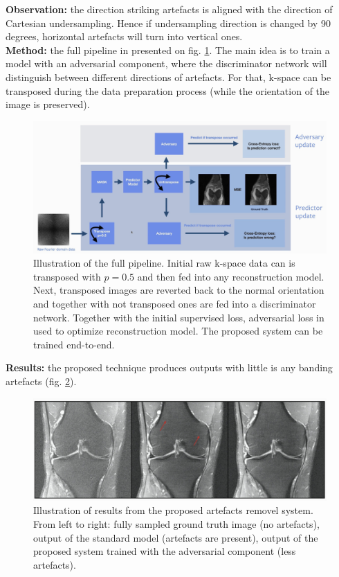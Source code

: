 {\bf Observation:} the direction striking artefacts is aligned with the direction of Cartesian undersampling. Hence if undersampling direction is changed by 90 degrees, horizontal artefacts will turn into vertical ones. \\

{\bf Method:} the full pipeline in presented on fig. \ref{fig:adversaria_art_removal_pipeline}. The main idea is to train a model with an adversarial component, where the discriminator network will distinguish between different directions of artefacts. 
For that, k-space can be transposed during the data preparation process (while the orientation of the image is preserved). \\

\begin{figure}[h!]
    \centering
    \includegraphics[scale=0.4]{neurips-2020/images/Screenshot 2020-12-15 at 09.34.10.png}
    \caption{Illustration of the full pipeline. Initial raw k-space data can is transposed with $p = 0.5$ and then fed into any reconstruction model. Next, transposed images are reverted back to the normal orientation and together with not transposed ones are fed into a discriminator network. Together with the initial supervised loss, adversarial loss in used to optimize reconstruction model. The proposed system can be trained end-to-end.}
    \label{fig:adversaria_art_removal_pipeline}
\end{figure}

{\bf Results:} the proposed technique produces outputs with little is any banding artefacts (fig. \ref{fig:result_adv_art_removal}).

\begin{figure}[h!]
    \centering
    \includegraphics[scale=0.4]{neurips-2020/images/Screenshot 2020-12-15 at 09.45.10.png}
    \caption{Illustration of results from the proposed artefacts removel system. From left to right: fully sampled ground truth image (no artefacts), output of the standard model (artefacts are present), output of the proposed system trained with the adversarial component (less artefacts).}
    \label{fig:result_adv_art_removal}
\end{figure}
